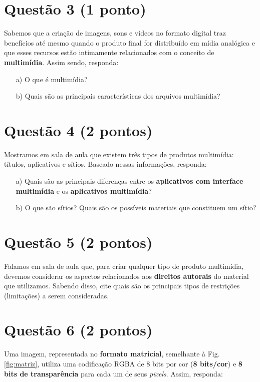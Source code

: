 \documentclass[a4paper,11pt]{article}
\begin{document}
\pagebreak

\section*{Questão 3 (1 ponto)}
Sabemos que a criação de imagens, sons e vídeos no formato digital traz
benefícios até mesmo quando o produto final for distribuído em mídia analógica e
que esses recursos estão intimamente relacionados com o conceito de {\bf
multimídia}. Assim sendo, responda:

\begin{itemize}
    \item[a)] O que é multimídia?
    \item[b)] Quais são as principais características dos arquivos multimídia?
\end{itemize}

\pagebreak

\section*{Questão 4 (2 pontos)}
Mostramos em sala de aula que existem três tipos de produtos multimídia:
títulos, aplicativos e sítios. Baseado nessas informações, responda:

\begin{itemize}
    \item[a)] Quais são as principais diferenças entre os {\bf aplicativos com
interface multimídia} e os {\bf aplicativos multimídia}?
    \item[b)] O que são sítios? Quais são os possíveis materiais que constituem
um sítio?
\end{itemize}

\pagebreak

\section*{Questão 5 (2 pontos)}
Falamos em sala de aula que, para criar qualquer tipo de produto multimídia,
devemos considerar os aspectos relacionados aos {\bf direitos autorais} do
material que utilizamos. Sabendo disso, cite quais são os principais tipos de
restrições (limitações) a serem consideradas.

\pagebreak

\section*{Questão 6 (2 pontos)}
Uma imagem, representada no {\bf formato matricial}, semelhante à Fig.
\ref{fig:matriz}, utiliza uma codificação RGBA de 8 bits por cor ({\bf 8
bits/cor}) e {\bf 8 bits de transparência} para cada um de seus {\it pixels}.
Assim, responda:
\end{document}
